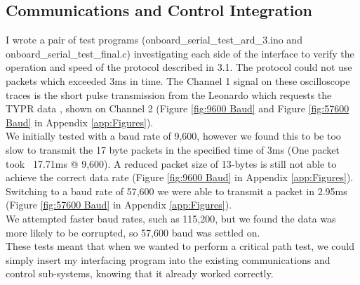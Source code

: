 \documentclass[a4paper,11pt]{article}
\begin{document}
\subsection{Communications and Control Integration}
I wrote a pair of test programs (onboard\_serial\_test\_ard\_3.ino and onboard\_serial\_test\_final.c) investigating each side of the interface to verify the operation and speed of the protocol described in 3.1. The protocol could not use packets which exceeded 3ms in time. The Channel 1 signal on these oscilloscope traces is the short pulse transmission from the Leonardo \cite{Pulse Function} which requests the TYPR data \cite{TYPR transmit}, shown on Channel 2 (Figure \ref{fig:9600 Baud} and Figure \ref{fig:57600 Baud} in Appendix \ref{app:Figures}).  \\
We initially tested with a baud rate of 9,600, however we found this to be too slow to transmit the 17 byte packets in the specified time of 3ms (One packet took ~17.71ms @ 9,600). A reduced packet size of 13-bytes is still not able to achieve the correct data rate (Figure \ref{fig:9600 Baud} in Appendix \ref{app:Figures}). 
Switching to a baud rate of 57,600 we were able to transmit a packet in 2.95ms (Figure \ref{fig:57600 Baud} in Appendix \ref{app:Figures}).\\
We attempted faster baud rates, such as 115,200, but we found the data was more likely to be corrupted, so 57,600 baud was settled on.\\
These tests meant that when we wanted to perform a critical path test, we could simply insert my interfacing program into the existing communications and control sub-systems, knowing that it already worked correctly.
\end{document}
